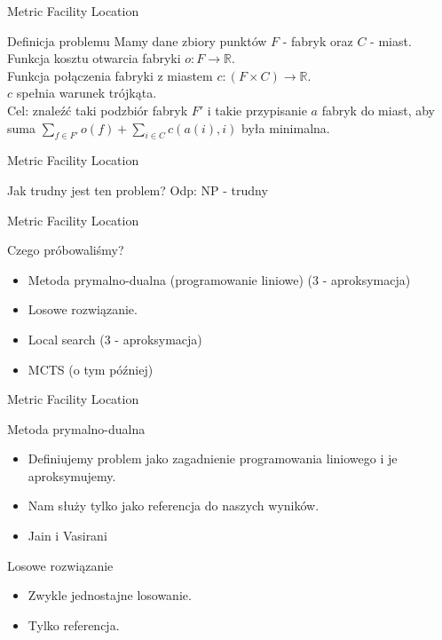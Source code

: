 \begin{frame}{Metric Facility Location}
  \begin{block}{Definicja problemu}
    Mamy dane zbiory punktów $F$ - fabryk oraz $C$ - miast. \\
    Funkcja kosztu otwarcia fabryki $o: F \rightarrow \mathbb{R}$. \\
    Funkcja połączenia fabryki z miastem $c: (F \times C) \rightarrow \mathbb{R}$. \\
    $c$ spełnia warunek trójkąta. \\
    Cel: znaleźć taki podzbiór fabryk $F'$ i takie przypisanie $a$ fabryk do miast, aby
    suma $\sum_{f \in F'}o(f) + \sum_{i \in C}c(a(i), i)$ była minimalna.
  \end{block}
\end{frame}

\begin{frame}{Metric Facility Location}
  \begin{block}{Jak trudny jest ten problem?}
    \pause
    Odp: NP - trudny
  \end{block}
\end{frame}

\begin{frame}{Metric Facility Location}
  \begin{block}{Czego próbowaliśmy?}
    \begin{itemize}
      \item Metoda prymalno-dualna (programowanie liniowe) (3 - aproksymacja)
      \item Losowe rozwiązanie. 
      \item Local search (3 - aproksymacja)
      \item MCTS (o tym później)
    \end{itemize}
  \end{block}
\end{frame}

\begin{frame}{Metric Facility Location}
  \begin{block}{Metoda prymalno-dualna}
    \begin{itemize}
      \pause
      \item Definiujemy problem jako zagadnienie programowania liniowego i je aproksymujemy.
      \pause
      \item Nam służy tylko jako referencja do naszych wyników.
      \pause
      \item Jain i Vasirani
    \end{itemize}
  \end{block}

  \pause

  \begin{block}{Losowe rozwiązanie}
    \begin{itemize}
      \item Zwykle jednostajne losowanie.
      \item Tylko referencja.
    \end{itemize}
  \end{block}
\end{frame}


